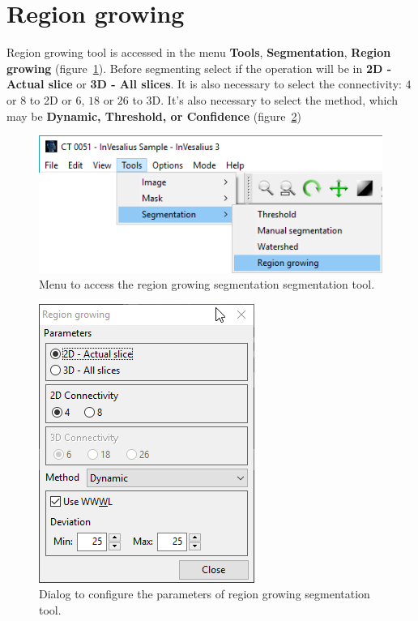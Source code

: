 \section{Region growing}

Region growing tool is accessed in the menu \textbf{Tools}, \textbf{Segmentation}, \textbf{Region growing} (figure~\ref{fig:menu_segmentation_region_growing}). Before segmenting select if the operation will be in \textbf{2D - Actual slice} or \textbf{3D - All slices}. It is also necessary to select the connectivity: $4$ or $8$ to 2D or $6$, $18$ or $26$ to 3D. It's also necessary to select the method, which may be \textbf{Dynamic, Threshold, or Confidence} (figure~\ref{fig:segmentation_region_growing_dinamic})

\begin{figure}[!htb]
    \centering
    \includegraphics[scale=0.5]{../user_guide_figures/invesalius_screen/menu_segmentation_region_growing_en.png}
    \caption{Menu to access the region growing segmentation segmentation tool.}
    \label{fig:menu_segmentation_region_growing}
\end{figure}

\begin{figure}[!htb]
    \centering
    \includegraphics[scale=0.7]{../user_guide_figures/invesalius_screen/segmentation_region_growing_dinamic_en.png}
    \caption{Dialog to configure the parameters of region growing segmentation tool.}
    \label{fig:segmentation_region_growing_dinamic}
\end{figure}

